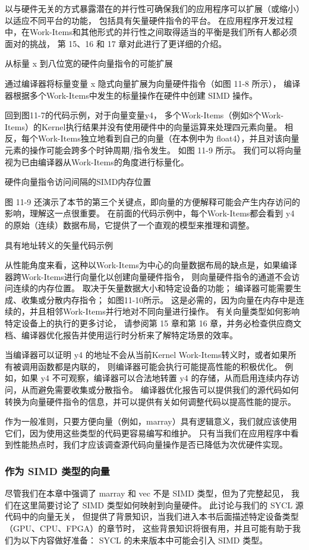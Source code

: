 以与硬件无关的方式暴露潜在的并行性可确保我们的应用程序可以扩展（或缩小）以适应不同平台的功能，
包括具有矢量硬件指令的平台。 
在应用程序开发过程中，在Work-Items和其他形式的并行性之间取得适当的平衡是我们所有人都必须面对的挑战，
第 15、16 和 17 章对此进行了更详细的介绍。

{\color{red} 从标量 x 到八位宽的硬件向量指令的可能扩展}

通过编译器将标量变量 x 隐式向量扩展为向量硬件指令（如图 11-8 所示），
编译器根据多个Work-Items中发生的标量操作在硬件中创建 SIMD 操作。

回到图11-7的代码示例，对于向量变量y4，
多个Work-Items（例如8个Work-Items）的Kernel执行结果并没有使用硬件中的向量运算来处理四元素向量。 
相反，每个Work-Items独立地看到自己的向量（在本例中为 float4），并且对该向量元素的操作可能会跨多个时钟周期/指令发生。 
如图 11-9 所示。 我们可以将向量视为已由编译器从Work-Items的角度进行标量化。

{\color{red} 硬件向量指令访问间隔的SIMD内存位置}

图 11-9 还演示了本节的第三个关键点，即向量的方便解释可能会产生内存访问的影响，理解这一点很重要。 
在前面的代码示例中，每个Work-Items都会看到 y4 的原始（连续）数据布局，它提供了一个直观的模型来推理和调整。

{\color{red} 具有地址转义的矢量代码示例}

从性能角度来看，这种以Work-Items为中心的向量数据布局的缺点是，如果编译器跨Work-Items进行向量化以创建向量硬件指令，
则向量硬件指令的通道不会访问连续的内存位置。 取决于矢量数据大小和特定设备的功能； 
编译器可能需要生成、收集或分散内存指令； 
如图11-10所示。 这是必需的，因为向量在内存中是连续的，并且相邻Work-Items并行地对不同向量进行操作。 
有关向量类型如何影响特定设备上的执行的更多讨论，
请参阅第 15 章和第 16 章，并务必检查供应商文档、编译器优化报告并使用运行时分析来了解特定场景的效率。

当编译器可以证明 y4 的地址不会从当前Kernel Work-Items转义时，或者如果所有被调用函数都是内联的，
则编译器可能会执行可能提高性能的积极优化。 
例如，如果 y4 不可观察，编译器可以合法地转置 y4 的存储，从而启用连续内存访问，从而避免需要收集或分散指令。 
编译器优化报告可以提供我们的源代码如何转换为向量硬件指令的信息，并可以提供有关如何调整代码以提高性能的提示。

作为一般准则，只要方便向量（例如，marray）具有逻辑意义，我们就应该使用它们，因为使用这些类型的代码更容易编写和维护。 
只有当我们在应用程序中看到性能热点时，我们才应该调查源代码向量操作是否已降低为次优硬件实现。

\subsubsection{作为 SIMD 类型的向量}
尽管我们在本章中强调了 marray 和 vec 不是 SIMD 类型，但为了完整起见，
我们在这里简要讨论了 SIMD 类型如何映射到向量硬件。 
此讨论与我们的 SYCL 源代码中的向量无关，
但提供了背景知识，当我们进入本书后面描述特定设备类型（GPU、CPU、FPGA）的章节时，
这些背景知识将很有用，并且可能有助于我们为以下内容做好准备： SYCL 的未来版本中可能会引入 SIMD 类型。

